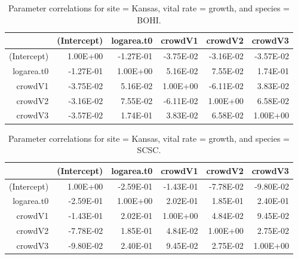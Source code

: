 \documentclass[12pt,]{article}
\begin{document}
\begin{table}[ht]
\centering
\caption{Parameter correlations for site = Kansas, vital rate = growth, and species = BOHI.} 
\begin{tabular}{rrrrrr}
  \hline
 & (Intercept) & logarea.t0 & crowdV1 & crowdV2 & crowdV3 \\ 
  \hline
(Intercept) & 1.00E+00 & -1.27E-01 & -3.75E-02 & -3.16E-02 & -3.57E-02 \\ 
  logarea.t0 & -1.27E-01 & 1.00E+00 & 5.16E-02 & 7.55E-02 & 1.74E-01 \\ 
  crowdV1 & -3.75E-02 & 5.16E-02 & 1.00E+00 & -6.11E-02 & 3.83E-02 \\ 
  crowdV2 & -3.16E-02 & 7.55E-02 & -6.11E-02 & 1.00E+00 & 6.58E-02 \\ 
  crowdV3 & -3.57E-02 & 1.74E-01 & 3.83E-02 & 6.58E-02 & 1.00E+00 \\ 
   \hline
\end{tabular}
\end{table}

\begin{table}[ht]
\centering
\caption{Parameter correlations for site = Kansas, vital rate = growth, and species = SCSC.} 
\begin{tabular}{rrrrrr}
  \hline
 & (Intercept) & logarea.t0 & crowdV1 & crowdV2 & crowdV3 \\ 
  \hline
(Intercept) & 1.00E+00 & -2.59E-01 & -1.43E-01 & -7.78E-02 & -9.80E-02 \\ 
  logarea.t0 & -2.59E-01 & 1.00E+00 & 2.02E-01 & 1.85E-01 & 2.40E-01 \\ 
  crowdV1 & -1.43E-01 & 2.02E-01 & 1.00E+00 & 4.84E-02 & 9.45E-02 \\ 
  crowdV2 & -7.78E-02 & 1.85E-01 & 4.84E-02 & 1.00E+00 & 2.75E-02 \\ 
  crowdV3 & -9.80E-02 & 2.40E-01 & 9.45E-02 & 2.75E-02 & 1.00E+00 \\ 
   \hline
\end{tabular}
\end{table}

\newpage{}
\end{document}
